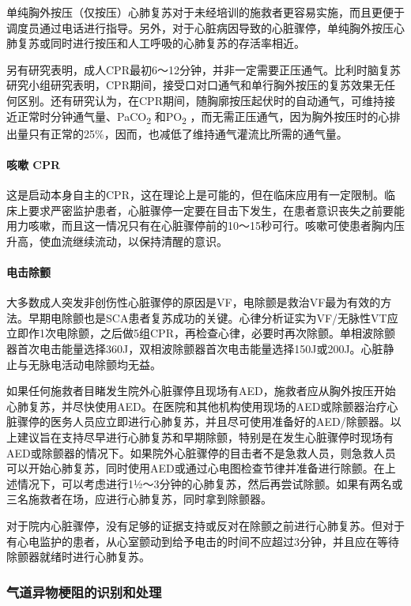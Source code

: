 单纯胸外按压（仅按压）心肺复苏对于未经培训的施救者更容易实施，而且更便于调度员通过电话进行指导。另外，对于心脏病因导致的心脏骤停，单纯胸外按压心肺复苏或同时进行按压和人工呼吸的心肺复苏的存活率相近。

另有研究表明，成人CPR最初6～12分钟，并非一定需要正压通气。比利时脑复苏研究小组研究表明，CPR期间，接受口对口通气和单行胸外按压的复苏效果无任何区别。还有研究认为，在CPR期间，随胸廓按压起伏时的自动通气，可维持接近正常时分钟通气量、PaCO\textsubscript{2}
和PO\textsubscript{2}
，而无需正压通气，因为胸外按压时的心排出量只有正常的25\%，因而，也减低了维持通气灌流比所需的通气量。

\paragraph{咳嗽 CPR}

这是启动本身自主的CPR，这在理论上是可能的，但在临床应用有一定限制。临床上要求严密监护患者，心脏骤停一定要在目击下发生，在患者意识丧失之前要能用力咳嗽，而且这一情况只有在心脏骤停前的10～15秒可行。咳嗽可使患者胸内压升高，使血流继续流动，以保持清醒的意识。

\paragraph{电击除颤}

大多数成人突发非创伤性心脏骤停的原因是VF，电除颤是救治VF最为有效的方法。早期电除颤也是SCA患者复苏成功的关键。心律分析证实为VF/无脉性VT应立即作1次电除颤，之后做5组CPR，再检查心律，必要时再次除颤。单相波除颤器首次电击能量选择360J，双相波除颤器首次电击能量选择150J或200J。心脏静止与无脉电活动电除颤均无益。

如果任何施救者目睹发生院外心脏骤停且现场有AED，施救者应从胸外按压开始心肺复苏，并尽快使用AED。在医院和其他机构使用现场的AED或除颤器治疗心脏骤停的医务人员应立即进行心肺复苏，并且尽可使用准备好的AED/除颤器。以上建议旨在支持尽早进行心肺复苏和早期除颤，特别是在发生心脏骤停时现场有AED或除颤器的情况下。如果院外心脏骤停的目击者不是急救人员，则急救人员可以开始心肺复苏，同时使用AED或通过心电图检查节律并准备进行除颤。在上述情况下，可以考虑进行1½～3分钟的心肺复苏，然后再尝试除颤。如果有两名或三名施救者在场，应进行心肺复苏，同时拿到除颤器。

对于院内心脏骤停，没有足够的证据支持或反对在除颤之前进行心肺复苏。但对于有心电监护的患者，从心室颤动到给予电击的时间不应超过3分钟，并且应在等待除颤器就绪时进行心肺复苏。

\subsubsection{气道异物梗阻的识别和处理}

